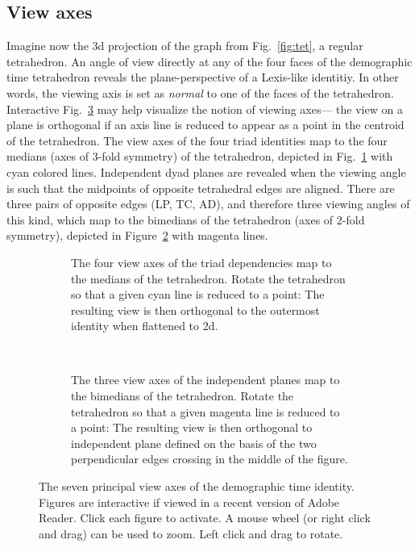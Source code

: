 \documentclass{bmcart}
\begin{document}
\subsection*{View axes}
\label{sec:viewaxes}
Imagine now the 3d projection of the graph from Fig.~\ref{fig:tet}, a regular tetrahedron. An angle of view directly at any of the four faces of the demographic time tetrahedron reveals the plane-perspective of a Lexis-like identitiy. In other words, the viewing axis is set as \emph{normal} to one of the faces of the tetrahedron. Interactive Fig.~\ref{fig:viewaxes} may help visualize the notion of viewing axes--- the view on a plane is orthogonal if an axis line is reduced to appear as a point in the centroid of the tetrahedron. The view axes of the four triad identities map to the four medians (axes of 3-fold symmetry) of the tetrahedron, depicted in
Fig.~\ref{fig:depviewaxes} with cyan colored lines. Independent dyad planes are revealed when the viewing angle is such that the midpoints of opposite tetrahedral edges are aligned. There are three pairs of opposite edges (LP, TC, AD), and therefore three viewing angles of this kind, which map to the bimedians of the tetrahedron (axes of 2-fold symmetry), depicted in Figure~\ref{fig:indepviewaxes} with magenta lines.

\begin{figure}
\begin{subfigure}[t]{0.45\linewidth}
    \centering
    \caption{The four view axes of the triad dependencies map to the medians of the tetrahedron. Rotate the tetrahedron so that a given cyan line is reduced to a point: The resulting view is then orthogonal to the outermost identity when flattened to 2d.}
    \label{fig:depviewaxes}
\end{subfigure}
~~
\begin{subfigure}[t]{0.45\linewidth}
    \caption{The three view axes of the independent planes map to the bimedians of the tetrahedron. Rotate the tetrahedron so that a given magenta line is reduced to a point: The resulting view is then orthogonal to independent plane defined on the basis of the two perpendicular edges crossing in the middle of the figure.}
    \label{fig:indepviewaxes}       
\end{subfigure}
\caption{The seven principal view axes of the demographic time identity. Figures are interactive if viewed in a recent version of Adobe Reader. Click each figure to activate. A mouse wheel (or right click and drag) can be used to zoom. Left click and drag to rotate.}
\label{fig:viewaxes}
\end{figure}
\end{document}
